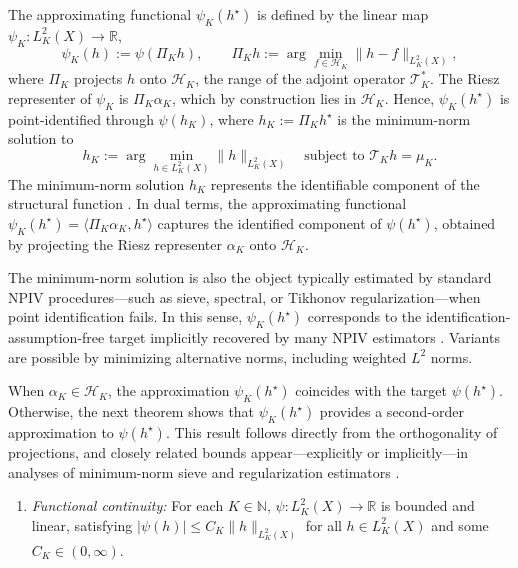 \documentclass[11pt]{article}
\theoremstyle{plain}
\theoremstyle{definition}
\theoremstyle{remark}
\theoremstyle{definition}
\begin{document}
The approximating functional \(\psi_K(h^\star)\) is defined by the linear map
\(\psi_K : L^2_K(X) \to \mathbb{R}\),
\[
    \psi_K(h) := \psi(\Pi_K h),
    \qquad
    \Pi_K h := \arg\min_{f \in \mathcal{H}_K} \| h - f \|_{L^2_K(X)},
\]
where \(\Pi_K\) projects \(h\) onto \(\mathcal{H}_K\), the range of the adjoint
operator \(\mathcal{T}_K^*\). The Riesz representer of \(\psi_K\) is
\(\Pi_K \alpha_K\), which by construction lies in \(\mathcal{H}_K\). Hence,
\(\psi_K(h^\star)\) is point-identified through \(\psi(h_K)\), where
\(h_K := \Pi_K h^\star\) is the minimum-norm solution to
\[
    h_K := \arg\min_{h \in L^2_K(X)} \|h\|_{L^2_K(X)}
    \quad \text{subject to } \mathcal{T}_K h = \mu_K.
\]
The minimum-norm solution \(h_K\) represents the identifiable component of the
structural function \citep{severini2006some}. In dual terms, the approximating
functional \(\psi_K(h^\star) = \langle \Pi_K \alpha_K, h^\star\rangle\)
captures the identified component of \(\psi(h^\star)\), obtained by projecting
the Riesz representer \(\alpha_K\) onto \(\mathcal{H}_K\).


The minimum-norm solution is also the object typically estimated by standard
NPIV procedures---such as sieve, spectral, or Tikhonov regularization---when
point identification fails. In this sense, $\psi_K(h^\star)$ corresponds to the
identification-assumption-free target implicitly recovered by many NPIV
estimators \citep{carrasco2007linear, darolles2011nonparametric,
babii2020completeness}. Variants are possible by minimizing alternative norms,
including weighted \(L^2\) norms.

 



When \(\alpha_K \in \mathcal{H}_K\), the approximation \(\psi_K(h^\star)\)
coincides with the target \(\psi(h^\star)\). Otherwise, the next theorem shows
that \(\psi_K(h^\star)\) provides a second-order approximation to
\(\psi(h^\star)\). This result follows directly from the orthogonality of
projections, and closely related bounds appear---explicitly or implicitly---in
analyses of minimum-norm sieve and regularization estimators
\citep{shen1997methods, newey1997convergence, newey2003instrumental,
chen2012estimation, babii2020completeness}.






\begin{enumerate}[label=\bf{C\arabic*)}, ref=C\arabic*, series=cond]
\item \textit{Functional continuity:} \label{cond::continousfun}
For each \( K \in \mathbb{N} \), \( \psi : L^2_K(X) \to \mathbb{R} \) is bounded
and linear, satisfying \( |\psi(h)| \le C_K \|h\|_{L^2_K(X)} \) for all
\( h \in L^2_K(X) \) and some \( C_K \in (0, \infty) \).
\end{enumerate}
\end{document}
